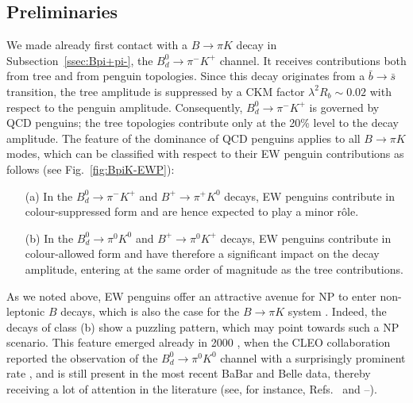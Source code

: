 \documentclass[12pt]{article}
\begin{document}
\subsection{Preliminaries}\label{ssec:BpiK-prel}
%
%
%
We made already first contact with a $B\to\pi K$ decay in 
Subsection~\ref{ssec:Bpi+pi-}, the $B^0_d\to\pi^-K^+$ channel. It receives
contributions both from tree and from penguin topologies. Since this decay
originates from a $\bar b\to\bar s$ transition, the tree amplitude is suppressed
by a CKM factor $\lambda^2 R_b\sim 0.02$ with respect to the penguin
amplitude. Consequently, $B^0_d\to\pi^-K^+$ is governed by QCD penguins;
the tree topologies contribute only at the 20\% level to the decay amplitude.
The feature of the dominance of QCD penguins applies to all $B\to\pi K$ modes, 
which can be classified with respect to their EW penguin contributions 
as follows (see Fig.~\ref{fig:BpiK-EWP}):
\begin{itemize}
\item[(a)] In the $B^0_d\to\pi^-K^+$ and $B^+\to\pi^+K^0$ decays, EW penguins 
contribute in colour-suppressed form and are hence expected to play a minor r\^ole.
\item[(b)] In the $B^0_d\to\pi^0K^0$ and $B^+\to\pi^0K^+$ decays, EW penguins 
contribute in colour-allowed form and have therefore a significant impact on the decay 
amplitude, entering at the same order of magnitude as the tree contributions.
\end{itemize}
As we noted above, EW penguins offer an attractive avenue for NP to 
enter non-leptonic $B$ decays, which is also the case for the
$B\to\pi K$ system \cite{FM-BpiK-NP,trojan}. Indeed, the decays of class (b) 
show a puzzling pattern, which may point towards such a NP scenario.
This feature emerged already in 2000 \cite{BF00}, when the CLEO collaboration 
reported the observation of the $B^0_d\to\pi^0K^0$ channel with a surprisingly 
prominent rate \cite{CLEO00}, and is still present in the most recent BaBar and 
Belle data, thereby receiving a lot of attention in the literature (see, for instance, 
Refs.~\cite{Z-prime-BpiK} and \cite{BeNe}--\cite{WZ}).
\end{document}
